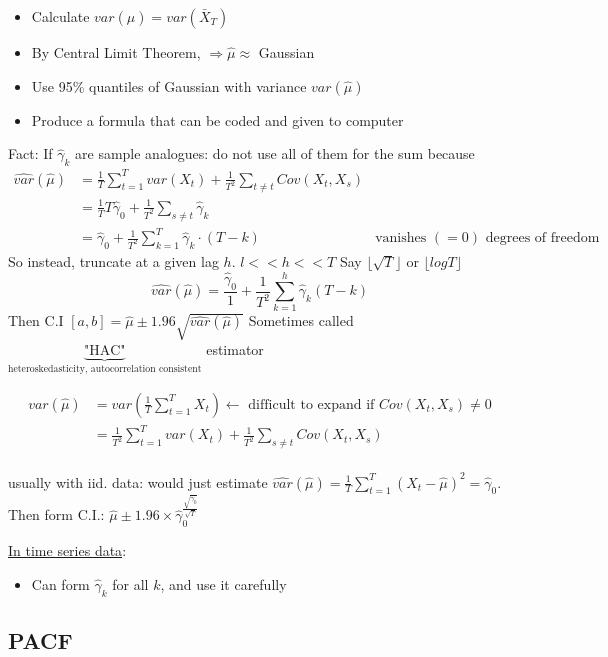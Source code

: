 \begin{itemize}
    \item Calculate $var(\hat{\mu})=var(\bar{X}_T) $
    \item By Central Limit Theorem, $\Rightarrow \hat{\mu} \approx$ Gaussian
    \item Use 95\% quantiles of Gaussian with variance $var(\hat{\mu})$
    \item Produce a formula that can be coded and given to computer
\end{itemize}
Fact: If $\hat{\gamma}_k$ are sample analogues: do not use all of them for the sum because \begin{align*}
    \hat{var}(\hat{\mu}) &= \frac{1}{T}\sum_{t=1}^T var(X_t) + \frac{1}{T^2} \sum_{t\neq t} Cov(X_t, X_s) \\
    &= \frac{1}{T} T \hat{\gamma}_0 + \frac{1}{T^2} \sum_{s\neq t} \hat{\gamma}_k\\
    &= \hat{\gamma}_0 + \frac{1}{T^2} \sum_{k=1}^T \hat{\gamma}_k \cdot (T-k)
    &\text{vanishes $(=0)$ degrees of freedom problem}
\end{align*}
So instead, truncate at a given lag $h$. $l<<h<<T$ \quad Say \( \lfloor \sqrt{T} \rfloor \) or \( \lfloor log T \rfloor \)
\[
\hat{var}(\hat{\mu})=\frac{\hat{\gamma}_0}{1} + \frac{1}{T^2}\sum_{k=1}^h \hat{\gamma}_k (T-k)
\]
Then C.I $[a,b]=\hat{\mu} \pm 1.96 \sqrt{\hat{var}(\hat{\mu})} $
Sometimes called $\underbrace{\text{"HAC"}}_\text{heteroskedasticity, autocorrelation consistent}$ estimator

\begin{align*}
    var(\hat{\mu})&=var(\frac{1}{T}\sum_{t=1}^T X_t) \leftarrow \text{ difficult to expand if $Cov(X_t, X_s)\neq 0$}\\
    &=\frac{1}{T^2} \sum_{t=1}^T var(X_t) + \frac{1}{T^2} \sum_{s\neq t} Cov(X_t,X_s)\\
\end{align*}

usually with iid. data: would just estimate $\hat{var}(\hat{\mu})=\frac{1}{T}\sum_{t=1}^T(X_t-\hat{\mu})^2=\hat{\gamma}_0 $. Then form C.I.: $\hat{\mu}\pm 1.96 \times \hat{\gamma}_0^\frac{\sqrt{\hat{\gamma}_0}}{\sqrt{T}} $

\underline{In time series data}:
\begin{itemize}
    \item Can form $\hat{\gamma}_k$ for all $k$, and use it carefully
\end{itemize}


\subsection{PACF}

